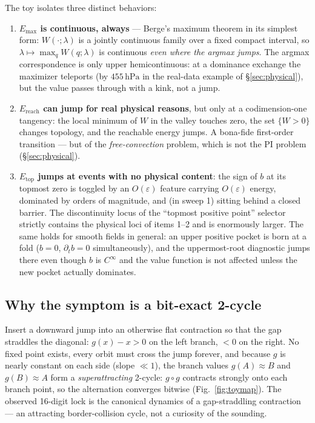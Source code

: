 \documentclass[11pt,a4paper]{article}
\theoremstyle{definition}
\newcommand{\Etop}{E_{\mathrm{top}}}
\newcommand{\Emax}{E_{\mathrm{max}}}
\newcommand{\Ereach}{E_{\mathrm{reach}}}
\newcommand{\hPa}{\,\mathrm{hPa}}
\begin{document}
The toy isolates three distinct behaviors:

\begin{enumerate}
\item \textbf{$\Emax$ is continuous, always} --- Berge's maximum theorem in
its simplest form: $W(\cdot;\lambda)$ is a jointly continuous family over a
fixed compact interval, so $\lambda\mapsto\max_q W(q;\lambda)$ is
continuous \emph{even where the argmax jumps}.  The argmax correspondence is
only upper hemicontinuous: at a dominance exchange the maximizer teleports
(by $455\hPa$ in the real-data example of \S\ref{sec:physical}), but the
value passes through with a kink, not a jump.
\item \textbf{$\Ereach$ can jump for real physical reasons}, but only at a
codimension-one tangency: the local minimum of $W$ in the valley touches
zero, the set $\{W>0\}$ changes topology, and the reachable energy jumps.
A bona-fide first-order transition --- but of the \emph{free-convection}
problem, which is not the PI problem (\S\ref{sec:physical}).
\item \textbf{$\Etop$ jumps at events with no physical content}: the sign of
$b$ at its topmost zero is toggled by an $O(\varepsilon)$ feature carrying
$O(\varepsilon)$ energy, dominated by orders of magnitude, and (in sweep 1)
sitting behind a closed barrier.  The discontinuity locus of the
``topmost positive point'' selector strictly contains the physical loci of
items 1--2 and is enormously larger.  The same holds for smooth fields in
general: an upper positive pocket is born at a fold ($b=0$, $\partial_t b=0$
simultaneously), and the uppermost-root diagnostic jumps there even though
$b$ is $C^\infty$ and the value function is not affected unless the new
pocket actually dominates.
\end{enumerate}

\subsection{Why the symptom is a bit-exact 2-cycle}

Insert a downward jump into an otherwise flat contraction so that the gap
straddles the diagonal: $g(x)-x>0$ on the left branch, $<0$ on the right.
No fixed point exists, every orbit must cross the jump forever, and because
$g$ is nearly constant on each side (slope $\ll1$), the branch values
$g(A)\approx B$ and $g(B)\approx A$ form a \emph{superattracting} 2-cycle:
$g\circ g$ contracts strongly onto each branch point, so the alternation
converges bitwise (Fig.~\ref{fig:toymap}).  The observed 16-digit lock is
the canonical dynamics of a gap-straddling contraction --- an attracting
border-collision cycle, not a curiosity of the sounding.
\end{document}
